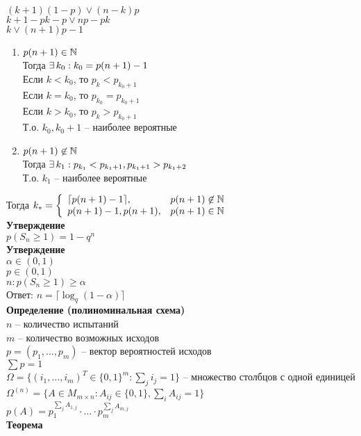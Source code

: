 \documentclass[12pt]{article}
\begin{document}
$(k+1)(1-p) \vee (n-k)p$\\
$k+1-pk-p \vee np - pk$\\
$k \vee (n+1)p - 1$
\begin{enumerate}
    \item $p(n+1) \in \mathbb{N}$\\
    Тогда $\exists\, k_0: k_0 = p(n+1) - 1$\\
    Если $k < k_0$, то $p_k < p_{k_0 + 1}$\\
    Если $k = k_0$, то $p_{k_0} = p_{k_0 + 1}$\\
    Если $k > k_0$, то $p_{k} > p_{k_0+1}$\\
    Т.о. $k_0, k_0 + 1$ -- наиболее вероятные
    \item $p(n+1) \not\in \mathbb{N}$\\
    Тогда $\exists\, k_1: p_{k_1} < p_{k_1+1}, p_{k_1+1} > p_{k_1+2}$\\
    Т.о. $k_1$ -- наиболее вероятные
\end{enumerate}
Тогда $k_* = \left\{\begin{array}{ll}
    \lceil p(n+1) - 1 \rceil, & p(n+1) \not\in \mathbb{N}\\
    p(n+1)-1, p(n+1), & p(n+1) \in \mathbb{N}
\end{array}\right.$\\
\textbf{Утверждение}\\
$p(S_n \geq 1) = 1 - q^n$\\
\textbf{Утверждение}\\
$\alpha \in (0, 1)$\\
$p \in (0, 1)$\\
$n: p(S_n \geq 1) \geq \alpha$\\
Ответ: $n = \lceil \log_q (1-\alpha) \rceil$\\
\textbf{Определение (полиноминальная схема)}\\
$n$ -- количество испытаний\\
$m$ -- количество возможных исходов\\
$p = (p_1, \ldots, p_m)$ -- вектор вероятностей исходов\\
$\sum p = 1$\\
$\Omega = \{ (i_1, \ldots, i_m)^T \in \{0,1\}^m: \sum_j i_j = 1\}$ -- множество столбцов с одной единицей\\
$\Omega^{(n)} = \{ A \in M_{m\times n}: A_{ij} \in \{0, 1\}, \sum_i A_{ij} = 1 \}$\\
$p(A) = p_1^{\sum_j A_{1,j}}\cdot \ldots \cdot p_m^{\sum_j A_{m,j}}$\\
\textbf{Теорема}\\
\end{document}
